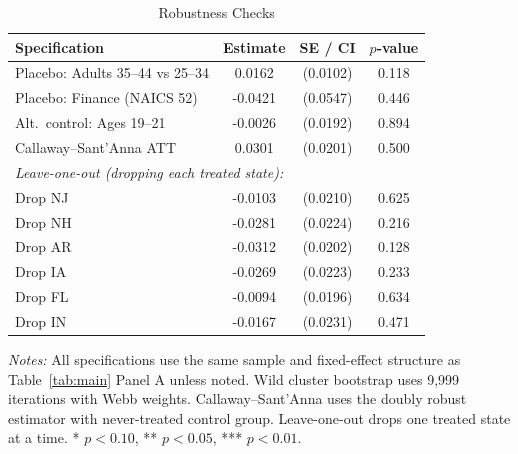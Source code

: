 \begin{table}[htbp]
\centering
\caption{Robustness Checks}
\label{tab:robustness}
\begin{threeparttable}
\begin{tabular}{lccc}
\toprule
Specification & Estimate & SE / CI & $p$-value \\
\midrule
Placebo: Adults 35--44 vs 25--34 & 0.0162 & (0.0102) & 0.118 \\
Placebo: Finance (NAICS 52) & -0.0421 & (0.0547) & 0.446 \\
Alt.\ control: Ages 19--21 & -0.0026 & (0.0192) & 0.894 \\
Callaway--Sant'Anna ATT & 0.0301 & (0.0201) & 0.500 \\
\midrule
\multicolumn{4}{l}{\textit{Leave-one-out (dropping each treated state):}} \\
\quad Drop NJ & -0.0103 & (0.0210) & 0.625 \\
\quad Drop NH & -0.0281 & (0.0224) & 0.216 \\
\quad Drop AR & -0.0312 & (0.0202) & 0.128 \\
\quad Drop IA & -0.0269 & (0.0223) & 0.233 \\
\quad Drop FL & -0.0094 & (0.0196) & 0.634 \\
\quad Drop IN & -0.0167 & (0.0231) & 0.471 \\
\bottomrule
\end{tabular}
\begin{tablenotes}[flushleft]
\small
\item \textit{Notes:} All specifications use the same sample and fixed-effect structure as Table~\ref{tab:main} Panel A unless noted. Wild cluster bootstrap uses 9,999 iterations with Webb weights. Callaway--Sant'Anna uses the doubly robust estimator with never-treated control group. Leave-one-out drops one treated state at a time. * $p<0.10$, ** $p<0.05$, *** $p<0.01$.
\end{tablenotes}
\end{threeparttable}
\end{table}
